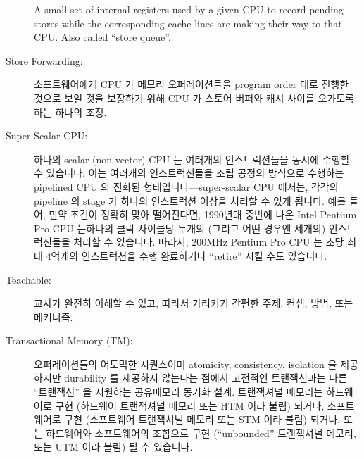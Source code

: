 \begin{description}
	A small set of internal registers used by a given CPU
	to record pending stores
	while the corresponding cache lines are making their
	way to that CPU.
	Also called ``store queue''.
	\fi
\item[Store Forwarding:]
	소프트웨어에게 CPU 가 메모리 오퍼레이션들을 program order 대로 진행한
	것으로 보일 것을 보장하기 위해 CPU 가 스토어 버퍼와 캐시 사이를
	오가도록 하는 하나의 조정.
	\iffalse

	An arrangement where a given CPU refers to its store buffer
	as well as its cache so as to ensure that the software sees
	the memory operations performed by this CPU as if they
	were carried out in program order.
	\fi
\item[Super-Scalar CPU:]
	하나의 scalar (non-vector) CPU 는 여러개의 인스트럭션들을 동시에 수행할
	수 있습니다.
	이는 여러개의 인스트럭션들을 조립 공정의 방식으로 수행하는 pipelined
	CPU 의 진화된 형태입니다---super-scalar CPU 에서는, 각각의 pipeline 의
	stage 가 하나의 인스트럭션 이상을 처리할 수 있게 됩니다.
	예를 들어, 만약 조건이 정확히 맞아 떨어진다면, 1990년대 중반에 나온
	Intel Pentium Pro CPU 는하나의 클락 사이클당 두개의 (그리고 어떤 경우엔
	세개의) 인스트럭션들을 처리할 수 있습니다.
	따라서, 200MHz Pentium Pro CPU 는 초당 최대 4억개의 인스트럭션을 수행
	완료하거나 ``retire'' 시킬 수도 있습니다.
	\iffalse

	A scalar (non-vector) CPU capable of executing multiple instructions
	concurrently.
	This is a step up from a pipelined CPU that executes multiple
	instructions in an assembly-line fashion---in a super-scalar
	CPU, each stage of the pipeline would be capable of handling
	more than one instruction.
	For example, if the conditions were exactly right,
	the Intel Pentium Pro CPU from the mid-1990s could
	execute two (and sometimes three) instructions per clock cycle.
	Thus, a 200MHz Pentium Pro CPU could ``retire'', or complete the
	execution of, up to 400 million instructions per second.
	\fi
\item[Teachable:]
	교사가 완전히 이해할 수 있고, 따라서 가리키기 간편한 주제, 컨셉, 방법,
	또는 메커니즘.
	\iffalse

	A topic, concept, method, or mechanism that the teacher understands
	completely and is therefore comfortable teaching.
	\fi
\item[Transactional Memory (TM):]
	오퍼레이션들의 어토믹한 시퀀스이며 atomicity, consistency, isolation 을
	제공하지만 durability 를 제공하지 않는다는 점에서 고전적인 트랜잭션과는
	다른 ``트랜잭션'' 을 지원하는 공유메모리 동기화 설계. 
	트랜잭셔널 메모리는 하드웨어로 구현 (하드웨어 트랜잭셔널 메모리 또는
	HTM 이라 불림) 되거나, 소프트웨어로 구현 (소프트웨어 트랜잭셔널 메모리
	또는 STM 이라 불림) 되거나, 또는 하드웨어와 소프트웨어의 조합으로 구현
	(``unbounded'' 트랜잭셔널 메모리, 또는 UTM 이라 불림) 될 수 있습니다.
	\iffalse


\end{description}
